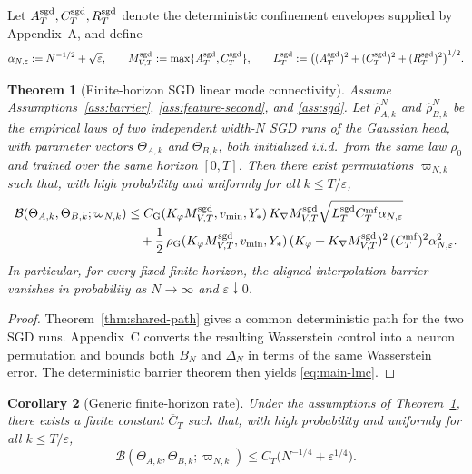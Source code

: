 \documentclass[11pt]{article}
\newtheorem{theorem}{Theorem}[section]
\newtheorem{corollary}[theorem]{Corollary}
\theoremstyle{definition}
\newcommand{\cB}{\mathcal{B}}
\begin{document}
Let $A_T^{\rm sgd},C_T^{\rm sgd},R_T^{\rm sgd}$ denote the deterministic
confinement envelopes supplied by Appendix~A, and define
\[
  \alpha_{N,\varepsilon}:=N^{-1/2}+\sqrt{\varepsilon},
  \qquad
  M_{V,T}^{\rm sgd}:=\max\{A_T^{\rm sgd},C_T^{\rm sgd}\},
  \qquad
  L_T^{\rm sgd}:=
  \bigl((A_T^{\rm sgd})^2+(C_T^{\rm sgd})^2+(R_T^{\rm sgd})^2\bigr)^{1/2}.
\]

\begin{theorem}[Finite-horizon SGD linear mode connectivity]
\label{thm:main-lmc}
Assume Assumptions~\ref{ass:barrier}, \ref{ass:feature-second}, and
\ref{ass:sgd}. Let $\hat\rho_{A,k}^N$ and $\hat\rho_{B,k}^N$ be the empirical
laws of two independent width-$N$ SGD runs of the Gaussian head, with
parameter vectors $\Theta_{A,k}$ and $\Theta_{B,k}$, both initialized i.i.d.\
from the same law $\rho_0$ and trained over the same horizon $[0,T]$.
Then there exist permutations $\varpi_{N,k}$ such that, with high probability
and uniformly for all $k\le T/\varepsilon$,
\begin{align}
  \cB(\Theta_{A,k},\Theta_{B,k};\varpi_{N,k})
  &\le
  C_{\rm G}(K_\varphi M_{V,T}^{\rm sgd},v_{\min},Y_\ast)\,
  K_{\nabla}M_{V,T}^{\rm sgd}
  \sqrt{L_T^{\rm sgd}C_T^{\rm mf}\alpha_{N,\varepsilon}}
  \nonumber\\
  &\quad+
  \frac12\,
  \rho_{\rm G}(K_\varphi M_{V,T}^{\rm sgd},v_{\min},Y_\ast)\,
  (K_\varphi+K_{\nabla}M_{V,T}^{\rm sgd})^2\,
  (C_T^{\rm mf})^2\alpha_{N,\varepsilon}^2.
  \label{eq:main-lmc}
\end{align}
In particular, for every fixed finite horizon, the aligned interpolation
barrier vanishes in probability as $N\to\infty$ and $\varepsilon\downarrow 0$.
\end{theorem}

\begin{proof}
Theorem~\ref{thm:shared-path} gives a common deterministic path for the two SGD
runs. Appendix~C converts the resulting Wasserstein control into a neuron
permutation and bounds both $B_N$ and $\Delta_N$ in terms of the same
Wasserstein error. The deterministic barrier theorem then yields
\eqref{eq:main-lmc}.
\end{proof}

\begin{corollary}[Generic finite-horizon rate]
\label{cor:generic-rate}
Under the assumptions of Theorem~\ref{thm:main-lmc}, there exists a finite
constant $\overline C_T$ such that, with high probability and uniformly for
all $k\le T/\varepsilon$,
\[
  \cB(\Theta_{A,k},\Theta_{B,k};\varpi_{N,k})
  \le
  \overline C_T\bigl(N^{-1/4}+\varepsilon^{1/4}\bigr).
\]
\end{corollary}
\end{document}
